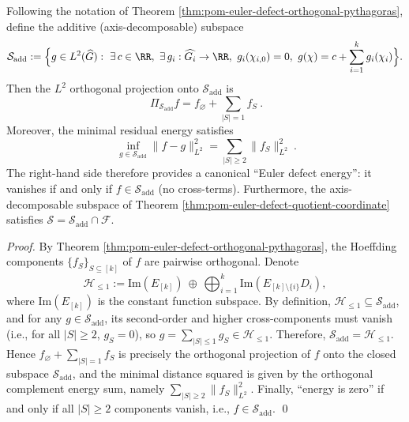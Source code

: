 \begin{theorem}\label{thm:pom-euler-defect-min-action-gauge}
Following the notation of Theorem \ref{thm:pom-euler-defect-orthogonal-pythagoras}, define the additive (axis-decomposable) subspace
\[
\mathcal S_{\mathrm{add}}
:=
\Bigl\{g\in L^2(\widehat G):\ \exists\,c\in\RR,\ \exists\,g_i:\widehat{G_i}\to\RR,\ g_i(\chi_{i,0})=0,\ g(\chi)=c+\sum_{i=1}^k g_i(\chi_i)\Bigr\}.
\]
Then the \(L^2\) orthogonal projection onto \(\mathcal S_{\mathrm{add}}\) is
\[
\boxed{\ \Pi_{\mathcal S_{\mathrm{add}}} f=f_{\varnothing}+\sum_{|S|=1} f_S\ }.
\]
Moreover, the minimal residual energy satisfies
\[
\boxed{\ \inf_{g\in\mathcal S_{\mathrm{add}}}\|f-g\|_{L^2}^2=\sum_{|S|\ge 2}\|f_S\|_{L^2}^2\ }.
\]
The right-hand side therefore provides a canonical ``Euler defect energy'': it vanishes if and only if \(f\in\mathcal S_{\mathrm{add}}\) (no cross-terms).
Furthermore, the axis-decomposable subspace of Theorem \ref{thm:pom-euler-defect-quotient-coordinate} satisfies \(\mathcal S=\mathcal S_{\mathrm{add}}\cap\mathcal F\).
\end{theorem}
\begin{proof}
By Theorem \ref{thm:pom-euler-defect-orthogonal-pythagoras}, the Hoeffding components \(\{f_S\}_{S\subseteq[k]}\) of \(f\) are pairwise orthogonal.
Denote
\[
\mathcal H_{\le 1}
:=\mathrm{Im}(E_{[k]})\ \oplus\ \bigoplus_{i=1}^k \mathrm{Im}(E_{[k]\setminus\{i\}}D_i),
\]
where \(\mathrm{Im}(E_{[k]})\) is the constant function subspace.
By definition, \(\mathcal H_{\le 1}\subseteq \mathcal S_{\mathrm{add}}\), and for any \(g\in\mathcal S_{\mathrm{add}}\), its second-order and higher cross-components must vanish (i.e., for all \(|S|\ge 2\), \(g_S=0\)), so \(g=\sum_{|S|\le 1} g_S\in \mathcal H_{\le 1}\).
Therefore, \(\mathcal S_{\mathrm{add}}=\mathcal H_{\le 1}\).
Hence \(f_{\varnothing}+\sum_{|S|=1}f_S\) is precisely the orthogonal projection of \(f\) onto the closed subspace \(\mathcal S_{\mathrm{add}}\), and the minimal distance squared is given by the orthogonal complement energy sum, namely
\(
\sum_{|S|\ge 2}\|f_S\|_{L^2}^2
\).
Finally, ``energy is zero'' if and only if all \(|S|\ge 2\) components vanish, i.e., \(f\in\mathcal S_{\mathrm{add}}\). \qed
\end{proof}

